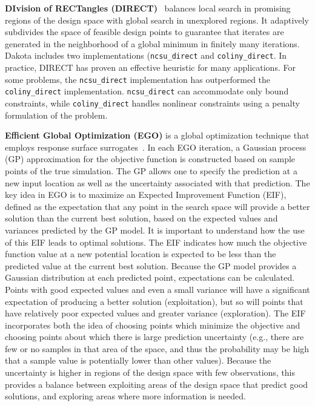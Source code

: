 {\bf DIvision of RECTangles (DIRECT)}~\cite{Gab01} balances local
search in promising regions of the design space with global search in
unexplored regions.  It adaptively subdivides the space of feasible
design points to guarantee that iterates are generated in the
neighborhood of a global minimum in finitely many iterations.  Dakota
includes two implementations (\texttt{ncsu\_direct} and
\texttt{coliny\_direct}.  In practice, DIRECT has proven an effective
heuristic for many applications.  For some problems, the
\texttt{ncsu\_direct} implementation has outperformed the
\texttt{coliny\_direct} implementation.  \texttt{ncsu\_direct} can
accommodate only bound constraints, while \texttt{coliny\_direct}
handles nonlinear constraints using a penalty formulation of the
problem.

{\bf Efficient Global Optimization (EGO)} is a global optimization
technique that employs response surface surrogates~\cite{Jon98,Hua06}.
In each EGO iteration, a Gaussian process (GP) approximation for the
objective function is constructed based on sample points of the true
simulation.  The GP allows one to specify the prediction at a new
input location as well as the uncertainty associated with that
prediction.  The key idea in EGO is to maximize an Expected
Improvement Function (EIF), defined as the expectation that any point
in the search space will provide a better solution than the current
best solution, based on the expected values and variances predicted by
the GP model.  It is important to understand how the use of this EIF
leads to optimal solutions.  The EIF indicates how much the objective
function value at a new potential location is expected to be less than
the predicted value at the current best solution.  Because the GP
model provides a Gaussian distribution at each predicted point,
expectations can be calculated.  Points with good expected values and
even a small variance will have a significant expectation of producing
a better solution (exploitation), but so will points that have
relatively poor expected values and greater variance (exploration).
The EIF incorporates both the idea of choosing points which minimize
the objective and choosing points about which there is large
prediction uncertainty (e.g., there are few or no samples in that area
of the space, and thus the probability may be high that a sample value
is potentially lower than other values).  Because the uncertainty is
higher in regions of the design space with few observations, this
provides a balance between exploiting areas of the design space that
predict good solutions, and exploring areas where more information is
needed.

